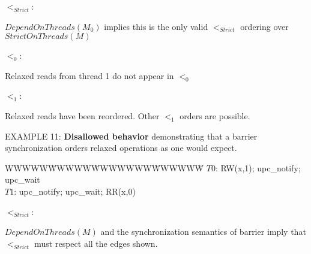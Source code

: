 \documentclass[12pt,titlepage]{article}
\newcounter{parnum}
\newcommand{\tab}{\textt{~~~~~~}}
\newcommand{\np}{
  \addtocounter{parnum}{1}
  \latex{\hspace{-2em}\makebox[2em][l]{\arabic{parnum}}}
  \html{{\bf {\arabic{parnum}}}\tab}}
\begin{document}
\bigskip
$<_{Strict}$:\hspace{0.25in}
\hspace{0.4in}
\parbox[t]{2.5in}
{$DependOnThreads(M_0)$ implies this is the only valid $<_{Strict}$ ordering
over $StrictOnThreads(M)$}

\bigskip
$<_0$:\hspace{0.25in}
\hspace{0.6in}
\parbox[t]{2.5in}
{Relaxed reads from thread 1 do not appear in $<_0$}

\bigskip
$<_1$:\hspace{0.25in}
\hspace{0.25in}
\parbox[t]{2in}
{Relaxed reads have been reordered. Other $<_1$ orders are possible.}

\bigskip
\np EXAMPLE 11: \textbf{Disallowed behavior} 
demonstrating that a barrier synchronization 
orders relaxed operations as one would expect.

\begin{tabbing}WWWWW\=WWWWW\=WWWWWWW\=WWWWWW\=\kill
$T0$: \> RW(x,1); \> upc\_notify; \> upc\_wait\\
$T1$: \> \> upc\_notify; \> upc\_wait; \> RR(x,0)\\
\end{tabbing}

\bigskip
$<_{Strict}$:\\
\hspace{0.1in}
\parbox[t]{2.3in}
{$DependOnThreads(M)$ and the synchronization semantics of barrier imply
that $<_{Strict}$ must respect all the edges shown.\footnotemark}
\end{document}
